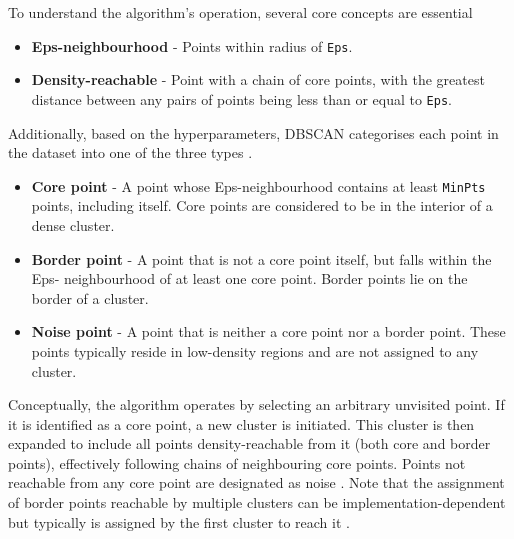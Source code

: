 \documentclass[10pt,oneside]{report}
\renewcommand{\citet}[1]{\citeauthor{#1}, \citeyear{#1}}
\begin{document}
To understand the algorithm's operation, several core concepts are essential \cite{ester1996density}
\begin{itemize}
    \item \textbf{Eps-neighbourhood} - Points within radius of \texttt{Eps}.
    \item \textbf{Density-reachable} - Point with a chain of core points, with the greatest distance between any pairs of points being less than or equal to \texttt{Eps}.
\end{itemize}

Additionally, based on the hyperparameters, DBSCAN categorises each point in the dataset into one of the three types \cite{ester1996density}. 
\begin{itemize}
    \item \textbf{Core point} - A point whose Eps-neighbourhood contains at least \texttt{MinPts} points, including itself. Core points are considered to be in the interior of a dense cluster.
    \item \textbf{Border point} - A point that is not a core point itself, but falls within the Eps- neighbourhood of at least one core point. Border points lie on the border of a cluster.
    \item \textbf{Noise point} - A point that is neither a core point nor a border point. These points typically reside in low-density regions and are not assigned to any cluster.
\end{itemize}

Conceptually, the algorithm operates by selecting an arbitrary unvisited point. If it is identified as a core point, a new cluster is initiated. This cluster is then expanded to include all points density-reachable from it (both core and border points), effectively following chains of neighbouring core points. Points not reachable from any core point are designated as noise \cite{ester1996density}. Note that the assignment of border points reachable by multiple clusters can be implementation-dependent but typically is assigned by the first cluster to reach it \cite{ester1996density}.

\end{document}
